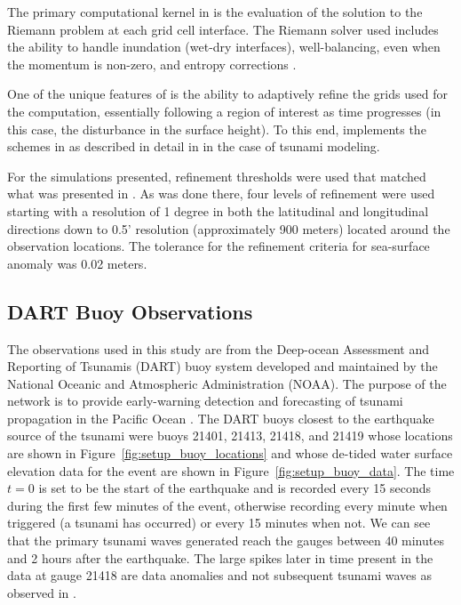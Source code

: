 The primary computational kernel in \geoclaw is the evaluation of the solution
to the Riemann problem at each grid cell interface.  The Riemann solver used
includes the ability to handle inundation (wet-dry interfaces), well-balancing,
even when the momentum is non-zero, and entropy corrections
\cite{George:2008aa}.

One of the unique features of \geoclaw is the ability to adaptively refine the
grids used for the computation, essentially following a region of interest as
time progresses (in this case, the disturbance in the surface height).
To this end, \geoclaw implements the schemes in \cite{Berger:1984ui,Berger:1998aa}
as described in detail in \cite{Berger:2011du} in the case of tsunami
modeling.

For the simulations presented, refinement thresholds were used that matched what
was presented in \cite{MacInnes:2013cr}.  As was done there, four levels of
refinement were used starting with a resolution of 1 degree in both the
latitudinal and longitudinal directions down to 0.5' resolution (approximately
900 meters) located around the observation locations.  The tolerance for the
refinement criteria for sea-surface anomaly was 0.02 meters.

\subsection{DART Buoy Observations}

The observations used in this study are from the Deep-ocean Assessment and
Reporting of Tsunamis (DART) buoy system developed and maintained by the
National Oceanic and Atmospheric Administration (NOAA).  The purpose of the
network is to provide early-warning detection and forecasting of tsunami
propagation in the Pacific Ocean \cite{Milburn:1996wm}.  The DART buoys closest
to the earthquake source of the \tohoku tsunami were buoys 21401, 21413, 21418,
and 21419 whose locations are shown in Figure~\ref{fig:setup_buoy_locations} and
whose de-tided water surface elevation data for the event are shown in
Figure~\ref{fig:setup_buoy_data}. The time $t=0$ is set to be the start of the
earthquake and is recorded every 15 seconds during the first few minutes of the
event, otherwise recording every minute when triggered (a tsunami has occurred)
or every 15 minutes when not.  We can see that the primary tsunami
waves generated reach the gauges between 40 minutes and 2 hours after the
earthquake.  The large spikes later in time present in the data at gauge 21418
are data anomalies and not subsequent tsunami waves as observed in \cite{MacInnes:2013cr}.

